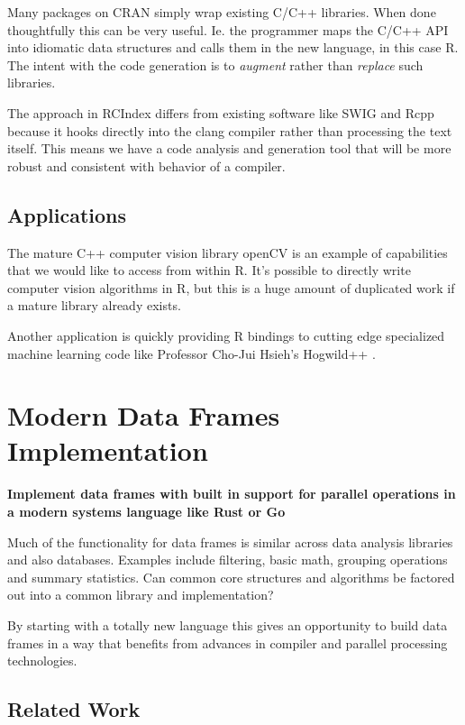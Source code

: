 \documentclass[12pt]{article}
\begin{document}
Many packages on CRAN simply wrap existing C/C++ libraries. When done
thoughtfully this can be very useful. Ie. the programmer maps the C/C++ API
into idiomatic data structures and calls them in the new language, in this
case R.  The intent with the code generation is to \emph{augment} rather
than \emph{replace} such libraries. 

The approach in RCIndex differs from existing software like SWIG
\cite{swig} and Rcpp \cite{R-Rcpp} because it hooks directly into the clang
compiler rather than processing the text itself. This means we have a code
analysis and generation tool that will be more robust and consistent with
behavior of a compiler. 

\subsection{Applications}

The mature C++ computer vision library openCV
\cite{opencv_library} is an example of capabilities that we would like to
access from within R. It's possible to directly write computer vision
algorithms in R, but this is a huge amount of duplicated work if a mature
library already exists.

Another application is quickly providing R bindings to cutting edge
specialized machine learning code like Professor Cho-Jui Hsieh's Hogwild++
\cite{zhang2016hogwild}.

\section{Modern Data Frames Implementation}

\textbf{Implement data frames with built in support for parallel operations
in a modern systems language like Rust or Go}

Much of the functionality for data frames is similar across data analysis
libraries and also databases. Examples include filtering, basic math,
grouping operations and summary statistics. Can common core structures
and algorithms be factored out into a common library and implementation?

By starting with a totally new language this gives an opportunity to build
data frames in a way that benefits from advances in compiler and
parallel processing technologies.

\subsection{Related Work}
\end{document}

